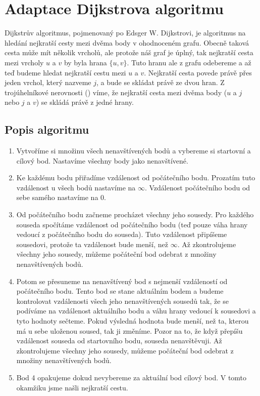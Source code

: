 \section{Adaptace Dijkstrova algoritmu}
\label{sec:dijkstra}

Dijkstrův algoritmus, pojmenovaný po Edsger W. Dijkstrovi, je algoritmus na hledání nejkratší cesty mezi dvěma body v ohodnoceném grafu. Obecně taková cesta může mít několik vrcholů, ale protože náš graf je úplný, tak nejkratší cesta mezi vrcholy $u$ a $v$ by byla hrana $\{u, v\}$. Tuto hranu ale z grafu odebereme a až teď budeme hledat nejkratší cestu mezi $u$ a $v$. Nejkratší cesta povede právě přes jeden vrchol, který nazveme $j$, a bude se skládat právě ze dvou hran. Z trojúhelníkové nerovnosti () víme, že nejkratší cesta mezi dvěma body ($u$ a $j$ nebo $j$ a $v$) se skládá právě z jedné hrany.

\subsection{Popis algoritmu}
\label{subsec:popis-algoritmu}

\begin{enumerate}
    \item Vytvoříme si množinu všech nenavštívených bodů a vybereme si startovní a cílový bod. Nastavíme všechny body jako nenavštívené. 
    \item Ke každému bodu přiřadíme vzdálenost od počátečního bodu. Prozatím tuto vzdálenost u všech bodů nastavíme na $\infty$. Vzdálenost počátečního bodu od sebe samého nastavíme na $0$.
    \item Od počátečního bodu začneme procházet všechny jeho sousedy. Pro každého souseda spočítáme vzdálenost od počátečního bodu (teď pouze váha hrany vedoucí z počátečního bodu do souseda). Tuto vzdálenost připíšeme sousedovi, protože ta vzdálenost bude menší, než $\infty$. Až zkontrolujeme všechny jeho sousedy, můžeme počáteční bod odebrat z množiny nenavštívených bodů.
    \item Potom se přesuneme na nenavštívený bod s nejmenší vzdáleností od počátečního bodu. Tento bod se stane aktuálním bodem a budeme kontrolovat vzdálenosti všech jeho nenavštívených sousedů tak, že se podíváme na vzdálenost aktuálního bodu a váhu hrany vedoucí k sousedovi a tyto hodnoty sečteme. Pokud výsledná hodnota bude menší, než ta, kterou má u sebe uloženou soused, tak ji změníme. Pozor na to, že když přepíšu vzdálenost souseda od startovního bodu, souseda nenavštěvuji. Až zkontrolujeme všechny jeho sousedy, můžeme počáteční bod odebrat z množiny nenavštívených bodů.
    \item Bod 4 opakujeme dokud nevybereme za aktuální bod cílový bod. V tomto okamžiku jsme našli nejkratší cestu.
\end{enumerate}